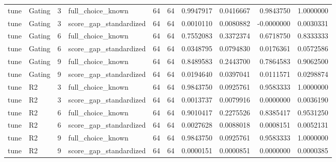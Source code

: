 \begin{tabular}{llrlrrrrrr}
tune & Gating & 3 & full_choice_known & 64 & 64 & 0.9947917 & 0.0416667 & 0.9843750 & 1.0000000 \\
tune & Gating & 3 & score_gap_standardized & 64 & 64 & 0.0010110 & 0.0080882 & -0.0000000 & 0.0030331 \\
tune & Gating & 6 & full_choice_known & 64 & 64 & 0.7552083 & 0.3372374 & 0.6718750 & 0.8333333 \\
tune & Gating & 6 & score_gap_standardized & 64 & 64 & 0.0348795 & 0.0794830 & 0.0176361 & 0.0572586 \\
tune & Gating & 9 & full_choice_known & 64 & 64 & 0.8489583 & 0.2443700 & 0.7864583 & 0.9062500 \\
tune & Gating & 9 & score_gap_standardized & 64 & 64 & 0.0194640 & 0.0397041 & 0.0111571 & 0.0298874 \\
tune & R2 & 3 & full_choice_known & 64 & 64 & 0.9843750 & 0.0925761 & 0.9583333 & 1.0000000 \\
tune & R2 & 3 & score_gap_standardized & 64 & 64 & 0.0013737 & 0.0079916 & 0.0000000 & 0.0036190 \\
tune & R2 & 6 & full_choice_known & 64 & 64 & 0.9010417 & 0.2275526 & 0.8385417 & 0.9531250 \\
tune & R2 & 6 & score_gap_standardized & 64 & 64 & 0.0027628 & 0.0088018 & 0.0008151 & 0.0052131 \\
tune & R2 & 9 & full_choice_known & 64 & 64 & 0.9843750 & 0.0925761 & 0.9583333 & 1.0000000 \\
tune & R2 & 9 & score_gap_standardized & 64 & 64 & 0.0000151 & 0.0000851 & 0.0000000 & 0.0000385 \\
\bottomrule
\end{tabular}

